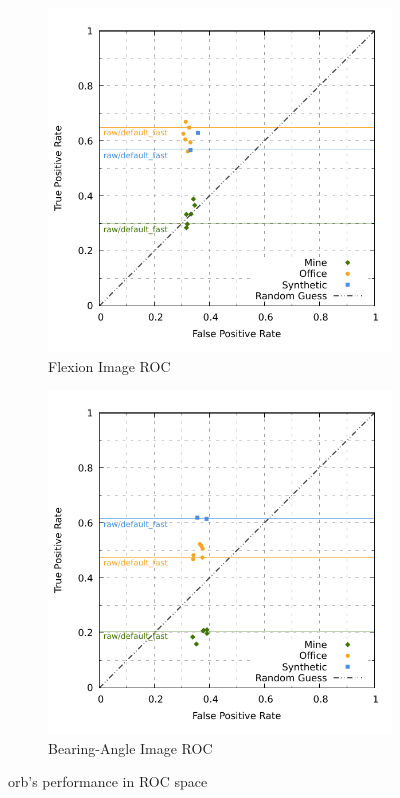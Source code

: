 \begin{figure}[htp]
\begin{subfigure}[t]{0.45\linewidth}
    \includegraphics[width=\linewidth]{chapter06/results/ORB/flexion/roc.pdf}%
    \caption{Flexion Image ROC}
\end{subfigure}\quad
\begin{subfigure}[t]{0.45\linewidth}
    \includegraphics[width=\linewidth]{chapter06/results/ORB/bearing/roc.pdf}
    \caption{Bearing-Angle Image ROC}
\end{subfigure}
    \caption{\acrshort{orb}'s performance in ROC space}\label{fig:orb_roc}
\end{figure}
